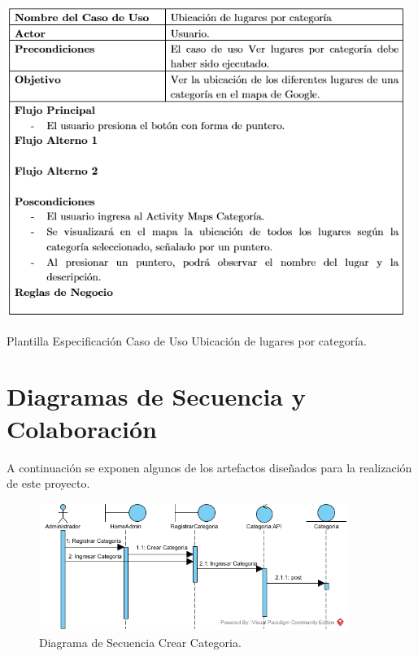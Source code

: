 \documentclass[12pt,letterpaper,openany]{book}
\begin{document}
\begin{table}[H]
\centering
\includegraphics[width=13cm]{./imagenes/PCU/ubicacion_lugar_categoria}
\caption{Plantilla Especificación Caso de Uso Ubicación de lugares por categoría.}
\end{table}

\chapter{Diagramas de Secuencia y Colaboración}\label{aped.C}
A continuación se exponen algunos de los artefactos diseñados para la realización de este proyecto.
\begin{figure}[H]
\begin{center}
\includegraphics[width=10cm]{./imagenes/DS/DS_crear_categoria}
\caption{Diagrama de Secuencia Crear Categoria.}
\end{center}
\end{figure}
\end{document}
